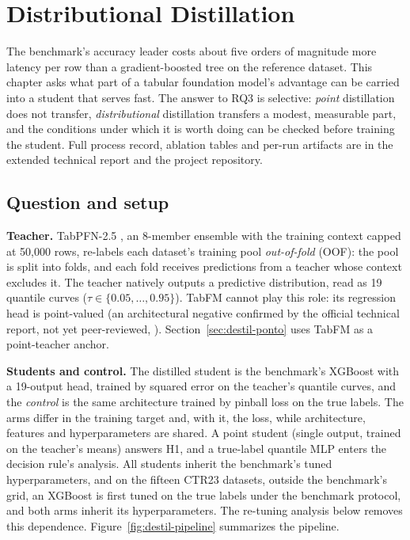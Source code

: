 \chapter{Distributional Distillation}
\label{chap:destilacao}

The benchmark's accuracy leader costs about five orders of
magnitude more latency per row than a gradient-boosted tree on the
reference dataset. This chapter asks what part of a
tabular foundation model's advantage can be carried into a student that serves
fast. The answer to RQ3 is selective: \emph{point} distillation does
not transfer, \emph{distributional} distillation transfers a modest,
measurable part, and the conditions under which it is worth doing
can be checked before training the student. Full process record,
ablation tables and per-run artifacts are in the extended
technical report and the project repository.

\section{Question and setup}
\label{sec:destil-setup}

\textbf{Teacher.} TabPFN-2.5 \citep{hollmann2025,priorlabs2025}, an
8-member ensemble with the training context capped at 50{,}000 rows,
re-labels each dataset's training pool \emph{out-of-fold}
(OOF): the pool is split into folds, and each fold receives
predictions from a teacher whose context excludes it. The teacher
natively outputs a predictive distribution, read as 19
quantile curves ($\tau \in \{0.05, \ldots, 0.95\}$). TabFM cannot
play this role: its regression head is point-valued (an
architectural negative confirmed by the official technical
report, not yet peer-reviewed, \citealp{kong2026}).
Section~\ref{sec:destil-ponto} uses TabFM as a point-teacher anchor.

\textbf{Students and control.} The distilled student is the
benchmark's XGBoost with a 19-output head, trained by squared error
on the teacher's quantile curves, and the \emph{control} is the same
architecture trained by pinball loss on the true labels. The arms
differ in the training target and, with it, the loss, while
architecture, features and hyperparameters are shared. A point
student (single output, trained on the teacher's means) answers H1,
and a true-label quantile MLP enters the decision rule's analysis. All students inherit the benchmark's tuned hyperparameters, and on
the fifteen CTR23 datasets, outside the benchmark's grid,
an XGBoost is first tuned on the true labels under the benchmark
protocol, and both arms inherit its hyperparameters. The re-tuning
analysis below removes this dependence.
Figure~\ref{fig:destil-pipeline} summarizes the pipeline.

